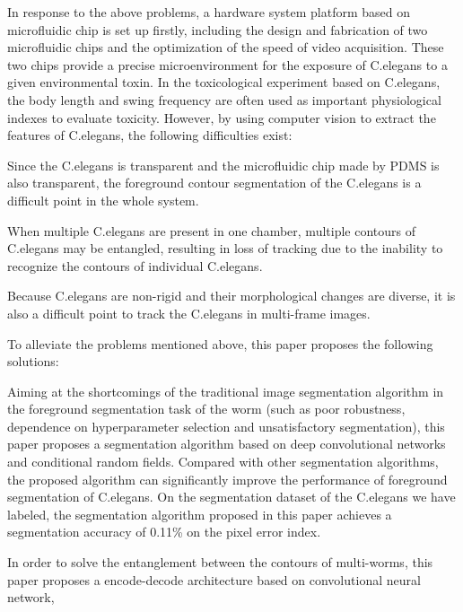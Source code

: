 \begin{englishabstract}
	In response to the above problems, a hardware system platform based on microfluidic chip 
	is set up firstly, including the design and fabrication of two microfluidic chips and 
	the optimization of the speed of  video acquisition.
	These two chips provide a precise microenvironment for the exposure of C.elegans
	to a given environmental toxin. 
	In the toxicological experiment based on C.elegans, the body length and 
	swing frequency are often used as important physiological indexes to evaluate 
	toxicity.
	However, by using computer vision to extract the features of C.elegans, 
	the following difficulties exist:
	\begin{enumerate*}[label=\itshape\alph*)\upshape]\quad
	\item Since the C.elegans is transparent and the microfluidic chip made by PDMS is also transparent, 
	the foreground contour segmentation of the C.elegans is a difficult point in the whole system.\quad
	\item When multiple C.elegans are present in one chamber, multiple contours of C.elegans may be
	entangled, resulting in loss of tracking due to the inability to recognize the contours of individual C.elegans.\quad
	\item Because C.elegans are non-rigid and their morphological changes are diverse, 
	it is also a difficult point to track the C.elegans in multi-frame images.\quad
	\end{enumerate*}
	To alleviate the problems mentioned above, this paper proposes the following solutions:
	\begin{enumerate*}[label=\itshape\alph*)\upshape]\quad
	\item Aiming at the shortcomings of the traditional image segmentation algorithm 
	in the foreground segmentation task of the worm (such as poor robustness, 
	dependence on hyperparameter selection and unsatisfactory segmentation), this paper proposes a segmentation algorithm 
	based on deep convolutional networks and conditional random fields. Compared with other segmentation algorithms, 
	the proposed algorithm can significantly improve the performance of  foreground segmentation of C.elegans.
	On the segmentation dataset of the C.elegans we have labeled, 
	the segmentation algorithm proposed in this paper achieves 
	a segmentation accuracy of 0.11\% on the pixel error index.\quad
	\item In order to solve the entanglement between the contours of multi-worms, 
	this paper proposes a encode-decode architecture based on convolutional neural network, 

\end{enumerate*}
\end{englishabstract}
